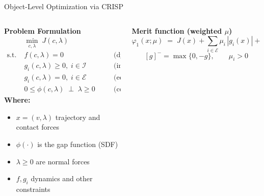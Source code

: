 \documentclass[10pt, aspectratio=169]{beamer}
\begin{document}
\begin{frame}{Object-Level Optimization via CRISP\,\footnotemark[1]}
  \begin{columns}[T,onlytextwidth]
    \begin{column}{0.46\textwidth}
      \small
      \textbf{Problem Formulation \quad \footnotesize\color{gray}{(Eq.~6)}}
      \[
      \begin{aligned}
        &\min_{c,\lambda}\; J(c,\lambda) \\
        \text{s.t.}\;& f(c,\lambda) = 0 \quad &&\text{(dynamics/defects)} \\
                     & g_i(c,\lambda) \ge 0,\; i\in\mathcal{I} \quad &&\text{(ineq.)} \\
                     & g_i(c,\lambda) = 0,\; i\in\mathcal{E} \quad &&\text{(eq.)} \\
                     & 0 \le \phi(c,\lambda) \;\perp\; \lambda \ge 0 \quad &&\text{(complementarity)}
      \end{aligned}
      \]
      \footnotesize
      \textbf{Where:} \\
      \begin{itemize}
          \item $x\!=\!(v,\lambda)$ trajectory and contact forces
          \item $\phi(\cdot)$ is the gap function (SDF) 
          \item $\lambda\!\ge\!0$ are normal forces
          \item $f,g_i$ dynamics and other constraints 
      \end{itemize}
    \end{column}

    \begin{column}{0.54\textwidth}
      \small
      \textbf{Merit function (weighted $\mu$) \quad \footnotesize\color{gray}{(Eq.~8)}}
      \[
        \varphi_1(x;\mu) \;=\; J(x)
        + \sum_{i\in\mathcal{E}} \mu_i\,|g_i(x)|
        + \sum_{i\in\mathcal{I}} \mu_i\,[g_i(x)]^{-},
      \]
      \vspace{-1.0em}
      \[ [g]^{-} = \max\{0,-g\},\qquad \mu_i>0  \]
      \vspace{-0.4em}


\end{column}
\end{columns}
\end{frame}
\end{document}
